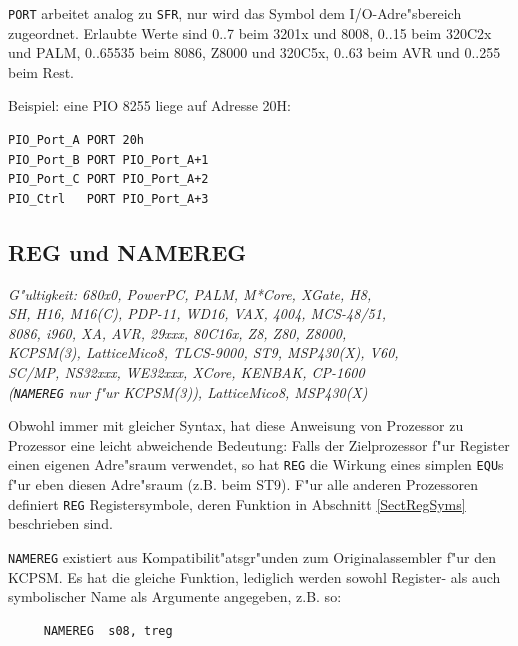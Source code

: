 \documentclass[12pt,a4paper,twoside]{report}
\makeatletter
\newcommand{\tty}[1]{{\tt #1}}
\newcommand{\ttindex}[1]{\index{#1@{\tt #1}}}
\makeatother
\begin{document}
\tty{PORT} arbeitet analog zu \tty{SFR}, nur wird das Symbol dem I/O-Adre"sbereich
zugeordnet.  Erlaubte Werte sind 0..7 beim 3201x und 8008, 0..15 beim 320C2x und PALM,
0..65535 beim 8086, Z8000 und 320C5x, 0..63 beim AVR und 0..255 beim Rest.
\par
Beispiel: eine PIO 8255 liege auf Adresse 20H:
\begin{verbatim}
PIO_Port_A PORT 20h
PIO_Port_B PORT PIO_Port_A+1
PIO_Port_C PORT PIO_Port_A+2
PIO_Ctrl   PORT PIO_Port_A+3
\end{verbatim}


\subsection{REG und NAMEREG}
\ttindex{REG}\ttindex{NAMEREG}

{\em G"ultigkeit: 680x0, PowerPC, PALM, M*Core, XGate, H8,\\
     SH, H16, M16(C), PDP-11, WD16, VAX, 4004, MCS-48/51,\\
     8086, i960, XA, AVR, 29xxx,  80C16x, Z8, Z80, Z8000,\\
     KCPSM(3), LatticeMico8, TLCS-9000, ST9, MSP430(X), V60,\\
     SC/MP, NS32xxx, WE32xxx, XCore, KENBAK, CP-1600\\
     (\tty{NAMEREG} nur f"ur KCPSM(3)), LatticeMico8, MSP430(X)}

Obwohl immer mit gleicher Syntax, hat diese Anweisung von Prozessor
zu Prozessor eine leicht abweichende Bedeutung: Falls der Zielprozessor
f"ur Register einen eigenen Adre"sraum verwendet, so hat \tty{REG}
die Wirkung eines simplen \tty{EQU}s f"ur eben diesen Adre"sraum (z.B. beim
ST9).  F"ur alle anderen Prozessoren definiert \tty{REG} Registersymbole,
deren Funktion in Abschnitt \ref{SectRegSyms} beschrieben sind.

{\tt NAMEREG} existiert aus Kompatibilit"atsgr"unden zum Originalassembler
f"ur den KCPSM.  Es hat die gleiche Funktion, lediglich werden sowohl
Register- als auch symbolischer Name als Argumente angegeben, z.B. so:
\begin{verbatim}
     NAMEREG  s08, treg
\end{verbatim}
\end{document}
